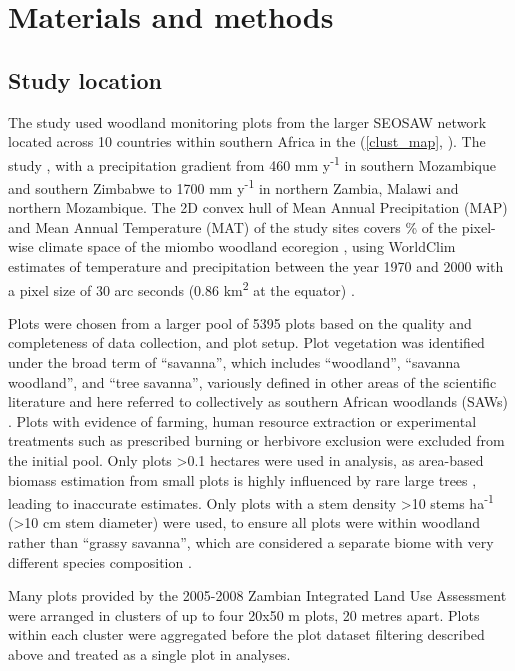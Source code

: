 \documentclass[11pt,a4paper]{article}
\newcommand{\textapprox}{\raisebox{0.5ex}{\texttildelow}}  %
\begin{document}
\section{Materials and methods}

\subsection{Study location}

The study used \nplots{} woodland monitoring plots from the larger SEOSAW network \citep{seosaw_web} located across 10 countries within southern Africa in the  (\autoref{clust_map}, \citealt{White1987}). The study , with a precipitation gradient from \textapprox{}460 mm y\textsuperscript{-1} in southern Mozambique and southern Zimbabwe to \textapprox{}1700 mm y\textsuperscript{-1} in northern Zambia, Malawi and northern Mozambique. The 2D convex hull of Mean Annual Precipitation (MAP) and Mean Annual Temperature (MAT) of the study sites covers \hullcover{}\% of the pixel-wise climate space of the miombo woodland ecoregion  \citep{White1987}, using WorldClim estimates of temperature and precipitation between the year 1970 and 2000 with a pixel size of 30 arc seconds (0.86 km\textsuperscript{2} at the equator) \citep{Fick2017}. 

Plots were chosen from a larger pool of 5395 plots based on the quality and completeness of data collection, and plot setup. Plot vegetation was identified under the broad term of ``savanna'', which includes ``woodland'', ``savanna woodland'', and ``tree savanna'', variously defined in other areas of the scientific literature and here referred to collectively as southern African woodlands (SAWs) \citep{Ratnam2011, Hill2010}. Plots with evidence of farming, human resource extraction or experimental treatments such as prescribed burning or herbivore exclusion were excluded from the initial pool. Only plots >0.1 hectares were used in analysis, as area-based biomass estimation from small plots is highly influenced by rare large trees \citep{Stegen2011}, leading to inaccurate estimates. Only plots with a stem density >10 stems ha\textsuperscript{-1} (>10 cm stem diameter) were used, to ensure all plots were within woodland rather than ``grassy savanna'', which are considered a separate biome with very different species composition \citep{Parr2014}. 

Many plots provided by the 2005-2008 Zambian Integrated Land Use Assessment \citep{Mukosha2009} were arranged in clusters of up to four 20x50 m plots, 20 metres apart. Plots within each cluster were aggregated before the plot dataset filtering described above and treated as a single plot in analyses.
\end{document}
